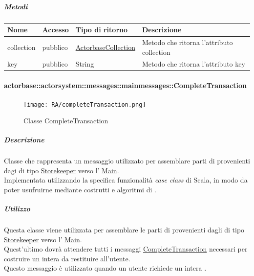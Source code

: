 \documentclass{scalatekids-article}
\begin{document}
\subparagraph{Metodi}
\begin{tabular}{| p{3cm} | p{1.5cm} | p{3.5cm} | p{9cm} |}
  \hline
  Nome & Accesso & Tipo di ritorno & Descrizione\\
  \hline
  collection & pubblico & \hyperref[sec:actorbase::actorsystem::utils::ActorbaseCollection]{ActorbaseCollection} & Metodo che ritorna l'attributo collection\\
  \hline
  key & pubblico & String & Metodo che ritorna l'attributo key\\
  \hline
\end{tabular}

\paragraph{actorbase::actorsystem::messages::mainmessages::CompleteTransaction}
\label{sec:actorbase::actorsystem::messages::mainmessages::CompleteTransaction}

\begin{figure}[H]
  \begin{center}
    \texttt{[image: RA/completeTransaction.png]}
    \caption{Classe CompleteTransaction}
  \end{center}
\end{figure}

\subparagraph{Descrizione}
Classe che rappresenta un messaggio utilizzato per assemblare parti di
 provenienti dagi  di tipo
\hyperref[sec:actorbase::actorsystem::actors::storekeeper::Storekeeper]{Storekeeper}
verso l'
\hyperref[sec:actorbase::actorsystem::actors::main::Main]{Main}.\\Implementata
utilizzando la specifica funzionalità \textit{case class} di Scala, in modo da
poter usufruirne mediante costrutti e algoritmi di .

\subparagraph{Utilizzo}
Questa classe viene utilizzata per assemblare le parti di  provenienti dagli 
di tipo \hyperref[sec:actorbase::actorsystem::actors::storekeeper::Storekeeper]{Storekeeper} verso l'
\hyperref[sec:actorbase::actorsystem::actors::main::Main]{Main}.\\Quest'ultimo
dovrà attendere tutti i messaggi
\hyperref[sec:actorbase::actorsystem::messages::mainmessages::CompleteTransaction]{CompleteTransaction}
necessari per costruire un intera  da restituire all'utente.\\Questo
messaggio è utilizzato quando un utente richiede un intera .
\end{document}
